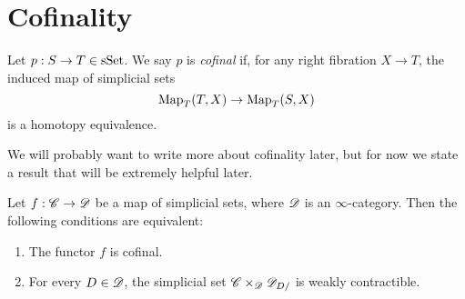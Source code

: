 \documentclass[../thesis.tex]{subfiles}
\begin{document}
\section{Cofinality}
\begin{definition}\cite[Definition 4.1.1.1]{HTT}
    Let \(p:S\to T \in \mathrm{sSet} \). We say $p$ is \emph{cofinal} if, for any right fibration $X\to T$, the induced map of simplicial sets
    \[
        \mathrm{Map}_T(T,X) \to \mathrm{Map}_T(S,X)
    \]
    is a homotopy equivalence.
\end{definition}
We will probably want to write more about cofinality later, but for now we state a result that will be extremely helpful later.
\begin{theorem}\cite[Theorem 4.1.3.1]{HTT}\label{superlemma}
    Let \(f: \mathscr{C} \to \mathscr{D}\) be a map of simplicial sets, where $\mathscr{D}$ is an $\infty$-category.
    Then the following conditions are equivalent:
    \begin{enumerate}
        \item The functor $f$ is cofinal.
        \item For every $D\in \mathscr{D}$, the simplicial set $\mathscr{C}\times_{\mathscr{D}} \mathscr{D}_{D/}$ is weakly contractible.
    \end{enumerate}
\end{theorem}
\end{document}
